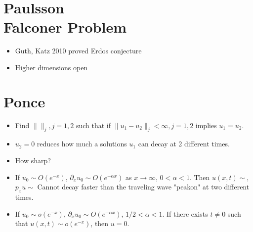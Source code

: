 \documentclass[12pt,reqno]{amsart}
\numberwithin{equation}{section}  %
\newcommand{\p}{\partial}
\begin{document}
\section{Paulsson \\ Falconer Problem}
\begin{itemize}
    \item 
	Guth, Katz 2010 proved Erdos conjecture
    \item{}
	Higher dimensions open
\end{itemize}

\section{Ponce}
\begin{itemize}
	$u_{1}, u_{2}$ solutions to some nonlinear dispersive equation
    \item
	Find $\|  \|_{j}, j=1,2$ such that if $\| u_{1} - u_{2} \|_{j} < \infty, j=1,2$ implies $u_{1} = u_{2}$.
    \item
	$u_{2} = 0$ reduces how much a solutions $u_{1}$ can decay at 2 different times.
    \item
	How sharp?
\end{itemize}


\begin{itemize}

Camassa-Holm. Himonas-Misiolek-Zhou
\item{}
If $u_{0} \sim O(e^{-x})$, $\p_{x} u_{0} \sim O(e^{-\alpha x})$ as $x \to \infty$, $0 < \alpha < 1$. Then $u(x,t) \sim$,  $p_{x} u \sim$
Cannot decay faster than the traveling wave "peakon" at two different times.
\item{}
If $u_{0} \sim o(e^{-x})$, $\p_{x} u_{0} \sim O(e^{-\alpha x})$, $1/2 < \alpha < 1$. If there exists $t \neq 0$ such that $u(x,t) \sim o(e^{-x})$, then $u = 0$.
\end{itemize}
\end{document}
